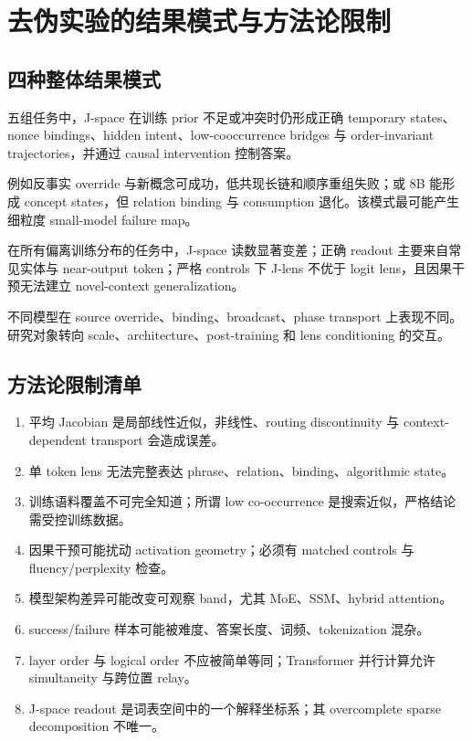 \documentclass[10.5pt,a4paper]{ctexart}
\begin{document}
\section{去伪实验的结果模式与方法论限制}

\subsection{四种整体结果模式}
\begin{description}[style=nextline,leftmargin=0pt]
  \item[模式 $\alpha$：广泛支持 context-conditioned active reasoning]
  五组任务中，J-space 在训练 prior 不足或冲突时仍形成正确 temporary states、nonce bindings、hidden intent、low-cooccurrence bridges 与 order-invariant trajectories，并通过 causal intervention 控制答案。

  \item[模式 $\beta$：部分支持，存在清晰能力边界]
  例如反事实 override 与新概念可成功，低共现长链和顺序重组失败；或 8B 能形成 concept states，但 relation binding 与 consumption 退化。该模式最可能产生细粒度 small-model failure map。

  \item[模式 $\gamma$：主要支持 prior/distribution recovery]
  在所有偏离训练分布的任务中，J-space 读数显著变差；正确 readout 主要来自常见实体与 near-output token；严格 controls 下 J-lens 不优于 logit lens，且因果干预无法建立 novel-context generalization。

  \item[模式 $\delta$：强模型/架构依赖]
  不同模型在 source override、binding、broadcast、phase transport 上表现不同。研究对象转向 scale、architecture、post-training 和 lens conditioning 的交互。
\end{description}

\subsection{方法论限制清单}
\begin{enumerate}
  \item 平均 Jacobian 是局部线性近似，非线性、routing discontinuity 与 context-dependent transport 会造成误差。
  \item 单 token lens 无法完整表达 phrase、relation、binding、algorithmic state。
  \item 训练语料覆盖不可完全知道；所谓 low co-occurrence 是搜索近似，严格结论需受控训练数据。
  \item 因果干预可能扰动 activation geometry；必须有 matched controls 与 fluency/perplexity 检查。
  \item 模型架构差异可能改变可观察 band，尤其 MoE、SSM、hybrid attention。
  \item success/failure 样本可能被难度、答案长度、词频、tokenization 混杂。
  \item layer order 与 logical order 不应被简单等同；Transformer 并行计算允许 simultaneity 与跨位置 relay。
  \item J-space readout 是词表空间中的一个解释坐标系；其 overcomplete sparse decomposition 不唯一。
\end{enumerate}
\end{document}
